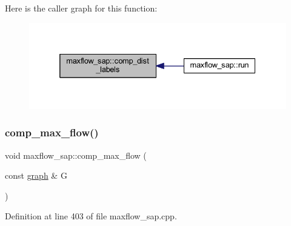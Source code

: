 Here is the caller graph for this function\+:\nopagebreak
\begin{figure}[H]
\begin{center}
\leavevmode
\includegraphics[width=332pt]{classmaxflow__sap_ab9a8d9e4e32a8eb6390c0d2fb3cb9596_icgraph}
\end{center}
\end{figure}
\mbox{\label{classmaxflow__sap_ae5ff08e7b1c5fe5845a2ed584b04ca1b}} 
\subsubsection{\texorpdfstring{comp\+\_\+max\+\_\+flow()}{comp\_max\_flow()}}
{\footnotesize\ttfamily void maxflow\+\_\+sap\+::comp\+\_\+max\+\_\+flow (\begin{DoxyParamCaption}\item[{const \mbox{\hyperlink{classgraph}{graph}} \&}]{G }\end{DoxyParamCaption})\hspace{0.3cm}{\ttfamily [protected]}}



Definition at line 403 of file maxflow\+\_\+sap.\+cpp.


